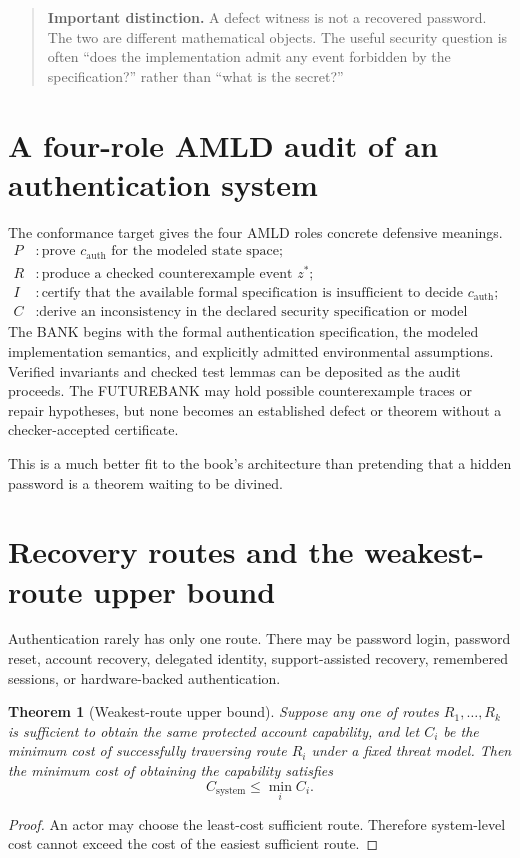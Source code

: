 \documentclass[11pt,openany]{book}
\newtheorem{theorem}{Theorem}[chapter]
\theoremstyle{definition}
\theoremstyle{remark}
\newenvironment{warningbox}{\begin{quote}\small\color{red!50!black}\textbf{Important distinction.} }{\end{quote}}
\begin{document}
\begin{warningbox}
A defect witness is not a recovered password. The two are different mathematical objects. The useful security question is often ``does the implementation admit any event forbidden by the specification?'' rather than ``what is the secret?''
\end{warningbox}

\section{A four-role AMLD audit of an authentication system}
The conformance target gives the four AMLD roles concrete defensive meanings.
\begin{align*}
P &: \text{prove }c_{\mathrm{auth}}\text{ for the modeled state space};\\
R &: \text{produce a checked counterexample event }z^*;\\
I &: \text{certify that the available formal specification is insufficient to decide }c_{\mathrm{auth}};\\
C &: \text{derive an inconsistency in the declared security specification or model assumptions.}
\end{align*}
The BANK begins with the formal authentication specification, the modeled implementation semantics, and explicitly admitted environmental assumptions. Verified invariants and checked test lemmas can be deposited as the audit proceeds. The FUTUREBANK may hold possible counterexample traces or repair hypotheses, but none becomes an established defect or theorem without a checker-accepted certificate.

This is a much better fit to the book's architecture than pretending that a hidden password is a theorem waiting to be divined.

\section{Recovery routes and the weakest-route upper bound}
Authentication rarely has only one route. There may be password login, password reset, account recovery, delegated identity, support-assisted recovery, remembered sessions, or hardware-backed authentication.

\begin{theorem}[Weakest-route upper bound]\label{thm:weakroute}
Suppose any one of routes $R_1,\ldots,R_k$ is sufficient to obtain the same protected account capability, and let $C_i$ be the minimum cost of successfully traversing route $R_i$ under a fixed threat model. Then the minimum cost of obtaining the capability satisfies
\[
C_{\mathrm{system}}\le \min_i C_i.
\]
\end{theorem}
\begin{proof}
An actor may choose the least-cost sufficient route. Therefore system-level cost cannot exceed the cost of the easiest sufficient route.
\end{proof}
\end{document}
